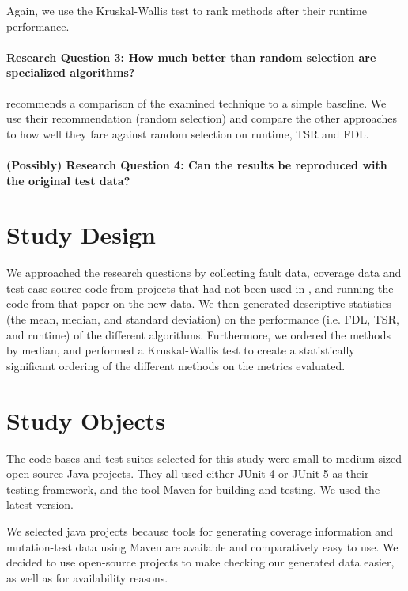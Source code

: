 Again, we use the Kruskal-Wallis test to rank methods after their
runtime performance.

\paragraph{Research Question 3: How much better than random selection are specialized algorithms?}

\cite{khan2018systematic} recommends a comparison of the examined
technique to a simple baseline. We use their recommendation (random
selection) and compare the other approaches to how well they fare against
random selection on runtime, TSR and FDL.

\paragraph{(Possibly) Research Question 4: Can the results be reproduced with the original test data?}

\section{Study Design}

We approached the research questions by collecting fault data, coverage
data and test case source code from projects that had not been used in
\cite{cruciani2019scalable}, and running the code from that paper on the
new data. We then generated descriptive statistics (the mean, median,
and standard deviation) on the performance (i.e. FDL, TSR, and runtime)
of the different algorithms. Furthermore, we ordered the methods by
median, and performed a Kruskal-Wallis test to create a statistically
significant ordering of the different methods on the metrics evaluated.

\section{Study Objects}

The code bases and test suites selected for this study were small to
medium sized open-source Java projects. They all used either JUnit
4 or JUnit 5 as their testing framework, and the tool Maven %
for building and testing. We used the latest version.

We selected java projects because tools for generating coverage
information and mutation-test data using Maven are available and
comparatively easy to use. We decided to use open-source projects to make
checking our generated data easier, as well as for availability reasons.

